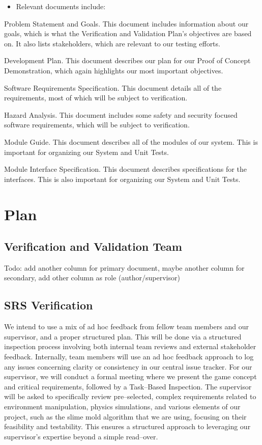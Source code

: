 \documentclass[12pt, titlepage]{article}
\begin{document}
\begin{itemize}
  \item Relevant documents include:
\end{itemize}

Problem Statement and Goals. This document includes information about our goals, which is what the Verification and Validation Plan’s objectives are based on. It also lists stakeholders, which are relevant to our testing efforts.

Development Plan. This document describes our plan for our Proof of Concept Demonstration, which again highlights our most important objectives.

Software Requirements Specification. This document details all of the requirements, most of which will be subject to verification.

Hazard Analysis. This document includes some safety and security focused software requirements, which will be subject to verification.

Module Guide. This document describes all of the modules of our system. This is important for organizing our System and Unit Tests.

Module Interface Specification. This document describes specifications for the interfaces. This is also important for organizing our System and Unit Tests.

\section{Plan}

\subsection{Verification and Validation Team}

Todo: add another column for primary document, maybe another column for secondary, add other column as role (author/supervisor)

\subsection{SRS Verification}

We intend to use a mix of ad hoc feedback from fellow team members and our supervisor, and a proper structured plan. This will be done via a structured inspection process involving both internal team reviews and external stakeholder feedback. Internally, team members will use an ad hoc feedback approach to log any issues concerning clarity or consistency in our central issue tracker. For our supervisor, we will conduct a formal meeting where we present the game concept and critical requirements, followed by a Task--Based Inspection. The supervisor will be asked to specifically review pre--selected, complex requirements related to environment manipulation, physics simulations, and various elements of our project, such as the slime mold algorithm that we are using, focusing on their feasibility and testability. This ensures a structured approach to leveraging our supervisor's expertise beyond a simple read--over.
\end{document}
